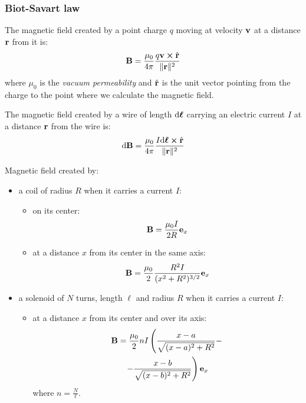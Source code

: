 \documentclass[../../../main.tex]{subfiles}
\begin{document}
\begin{multicols}{2}
  \subsubsection{Biot-Savart law}
  \begin{prop}
    The magnetic field created by a point charge $q$ moving at velocity $\boldsymbol{\mathrm{v}}$ at a distance $\boldsymbol{\mathrm{r}}$ from it is:
    $$\vectorfunction{B}=\frac{\mu_0}{4\pi}\frac{q\vectorfunction{v}\crossprod\Hat{\vectorfunction{r}}}{\|\vectorfunction{r}\|^2}$$ where $\mu_0$ is the \textit{vacuum permeability} and $\Hat{\boldsymbol{\mathrm{r}}}$ is the unit vector pointing from the charge to the point where we calculate the magnetic field.
  \end{prop}
  \begin{law}
    The magnetic field created by a wire of length $\dd\boldsymbol{\mathrm{\ell}}$ carrying an electric current $I$ at a distance $\boldsymbol{\mathrm{r}}$ from the wire is: $$\dd\vectorfunction{B}=\frac{\mu_0}{4\pi}\frac{I\dd\vectorfunction{\ell}\crossprod\hat{\vectorfunction{r}}}{\|\vectorfunction{r}\|^2}$$
  \end{law}
  \begin{prop}
    Magnetic field created by:
    \begin{itemize}
      \item a coil of radius $R$ when it carries a current $I$:
            \begin{itemize}
              \item on its center: $$\boldsymbol{\mathrm{B}}=\frac{\mu_0I}{2R}\boldsymbol{\mathrm{e}}_x$$
              \item at a distance $x$ from its center in the same axis: $$\boldsymbol{\mathrm{B}}=\frac{\mu_0}{2}\frac{R^2I}{(x^2+R^2)^{3/2}}\boldsymbol{\mathrm{e}}_x$$
            \end{itemize}
      \item a solenoid of $N$ turns, length $\ell$ and radius $R$ when it carries a current $I$:
            \begin{itemize}
              \item at a distance $x$ from its center and over its axis:
                    \begin{multline*} \boldsymbol{\mathrm{B}}=\frac{\mu_0}{2}nI\left(\frac{x-a}{\sqrt{(x-a)^2+R^2}}-\right.\\\left.-\frac{x-b}{\sqrt{(x-b)^2+R^2}}\right)\boldsymbol{\mathrm{e}}_x
                    \end{multline*} where $n=\frac{N}{\ell}$.
                    \begin{center}

\end{center}
\end{itemize}
\end{itemize}
\end{prop}
\end{multicols}
\end{document}
